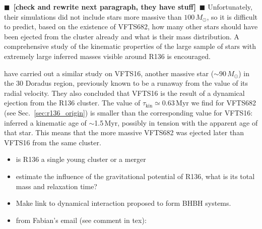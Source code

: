 \documentclass[apjl,twocolumn]{emulateapj}
\newcommand{\todo}[1]{{\large $\blacksquare$~\textbf{\color{red}[#1]}}~$\blacksquare$}
\DeclareRobustCommand{\Secref}[1]{Sec.~\ref{#1}}
\begin{document}
\todo{check \cite{banerjee} and rewrite next paragraph, they
  have stuff} Unfortunately, their simulations did not include stars more
massive than $100\,M_\odot$, so it is difficult to predict, based on
the existence of VFTS682, how many other stars should have been
ejected from the cluster already and what is their mass
distribution. A comprehensive study of the kinematic properties of the
large sample of stars with extremely large inferred masses visible
around R136 is encouraged.  

\cite{lennon:18} have carried out a similar study on VFTS16, another
massive star ($\sim90\,M_\odot$) in the 30 Doradus region, previously
known to be a runaway from the value of
its radial velocity. They also concluded that VFTS16 is 
the result of a dynamical ejection from the R136 cluster. 
The value of $\tau_\mathrm{kin}\simeq0.63$\,Myr we find for VFTS682 (see \Secref{sec:r136_origin}) is smaller
than the corresponding value for VFTS16: \cite{lennon:18} inferred a kinematic age of
$\sim$1.5\,Myr, possibly in tension with the apparent age of that star. This means that the more
massive VFTS682 was ejected later than VFTS16 from the same cluster.



\begin{itemize}
\item is R136 a single young cluster or a merger
\item estimate the influence of the gravitational potential of R136,
  what is its total mass and relaxation time?
\item Make link to dynamical interaction proposed to form BHBH
  systems.
  \item from Fabian's email (see comment in tex):%
\end{itemize}
\end{document}
